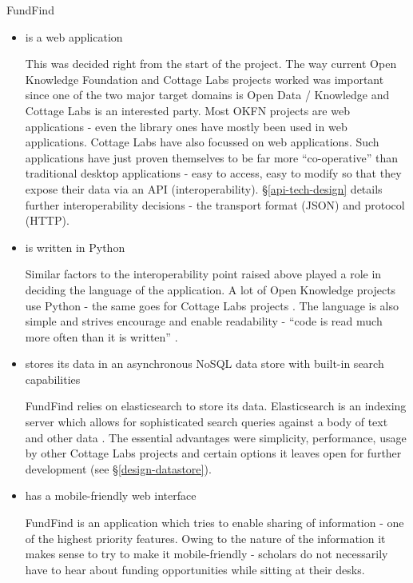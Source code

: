 FundFind
\begin{itemize}
 \item is a web application
 
This was decided right from the start of the project. The way current Open Knowledge Foundation and Cottage Labs projects worked was important since one of the two major target domains is Open Data / Knowledge and Cottage Labs is an interested party. Most OKFN projects are web applications - even the library ones have mostly been used in web applications. Cottage Labs have also focussed on web applications. Such applications have just proven themselves to be far more ``co-operative'' than traditional desktop applications - easy to access, easy to modify so that they expose their data via an API (interoperability). \S\ref{api-tech-design} details further interoperability decisions - the transport format (JSON) and protocol (HTTP).
 
 \item is written in Python

Similar factors to the interoperability point raised above played a role in deciding the language of the application. A lot of Open Knowledge projects use Python \cite{nomenklatura, offenesparlament, pybossa, activityapi} - the same goes for Cottage Labs projects \cite{leaps, portality, iioa, artemis, cl-web-code, xcri, negotiator}. The language is also simple and strives encourage and enable readability - ``code is read much more often than it is written'' \cite{pep8}.
 
 \item stores its data in an asynchronous NoSQL data store with built-in search capabilities
 
 FundFind relies on elasticsearch to store its data. Elasticsearch is an indexing server which allows for sophisticated search queries against a body of text and other data \cite{es}. The essential advantages were simplicity, performance, usage by other Cottage Labs projects and certain options it leaves open for further development (see \S\ref{design-datastore}).
 
 \item has a mobile-friendly web interface
 
 FundFind is an application which tries to enable sharing of information - one of the highest priority features. Owing to the nature of the information it makes sense to try to make it mobile-friendly - scholars do not necessarily have to hear about funding opportunities while sitting at their desks.
 

\end{itemize}
